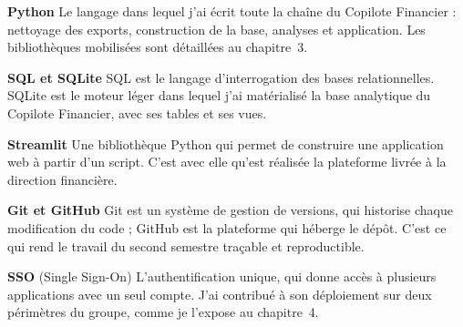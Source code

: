 \textbf{Python} Le langage dans lequel j'ai écrit toute la chaîne du Copilote Financier :
nettoyage des exports, construction de la base, analyses et application. Les bibliothèques
mobilisées sont détaillées au chapitre~3.

\textbf{SQL et SQLite} SQL est le langage d'interrogation des bases relationnelles. SQLite est
le moteur léger dans lequel j'ai matérialisé la base analytique du Copilote Financier, avec ses
tables et ses vues.

\textbf{Streamlit} Une bibliothèque Python qui permet de construire une application web à partir
d'un script. C'est avec elle qu'est réalisée la plateforme livrée à la direction financière.

\textbf{Git et GitHub} Git est un système de gestion de versions, qui historise chaque
modification du code ; GitHub est la plateforme qui héberge le dépôt. C'est ce qui rend le
travail du second semestre traçable et reproductible.

\textbf{SSO} (Single Sign-On) L'authentification unique, qui donne accès à plusieurs
applications avec un seul compte. J'ai contribué à son déploiement sur deux périmètres du
groupe, comme je l'expose au chapitre~4.
